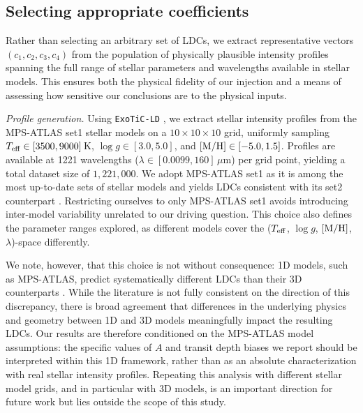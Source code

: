 \documentclass[twocolumn]{aastex631}
\newcommand{\vtwo}[1]{{#1}}
\begin{document}
\subsection{Selecting appropriate coefficients}\label{sec:appropriate_coeff}
Rather than selecting an arbitrary set of LDCs, we extract representative vectors $(c_1, c_2, c_3, c_4)$ from the population of physically plausible intensity profiles spanning the full range of stellar parameters and wavelengths available in stellar models. This ensures both the physical fidelity of our injection and a means of assessing how sensitive our conclusions are to the physical inputs.

\textit{Profile generation.} Using \texttt{ExoTiC-LD} \citep{ExoTiC-LD}, we extract stellar intensity profiles from the MPS-ATLAS set1 stellar models \citep{mpsset1} on a $10\times10\times10$ grid, uniformly sampling $T_{\rm eff} \in [3500, 9000]$\,K, $\log g \in [3.0, 5.0]$, and $[\rm M/\rm H] \in[-5.0, 1.5]$. Profiles are available at 1221 wavelengths ($\lambda \in [0.0099, 160]$\,$\mu$m) per grid point, yielding a total dataset size of $1{,}221{,}000$. We adopt MPS-ATLAS set1 as it is among the most up-to-date \vtwo{sets} of stellar models and yields LDCs consistent with its set2 counterpart \citep{mpsset2}. Restricting ourselves to only MPS-ATLAS set1 avoids introducing inter-model variability unrelated to our driving question. This choice also defines the parameter ranges explored, as different models cover the ($T_{\rm eff}$, $\log g$, $[\rm M/\rm H]$, $\lambda$)-space \vtwo{differently}. 

\vtwo{We note, however, that this choice is not without consequence: 1D models, such as MPS-ATLAS, predict systematically different LDCs than their 3D counterparts \citep[e.g.,][]{Hayek2012, Magic2015}. While the literature is not fully consistent on the direction of this discrepancy, there is broad agreement that differences in the underlying physics and geometry between 1D and 3D models meaningfully impact the resulting LDCs. Our results are therefore conditioned on the MPS-ATLAS model assumptions: the specific values of $A$ and transit depth biases we report should be interpreted within this 1D framework, rather than as an absolute characterization with real stellar intensity profiles. Repeating this analysis with different stellar model grids, and in particular with 3D models, is an important direction for future work but lies outside the scope of this study.}
\end{document}
